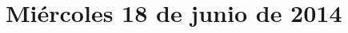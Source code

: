 \documentclass[12pt,spanish]{article}
\begin{document}
  \thispagestyle{empty}
  \pagestyle{empty}
  \section*{Miércoles 18 de junio de 2014}

  \begin{certamen}
    \item
      
  \end{certamen}
\end{document}
